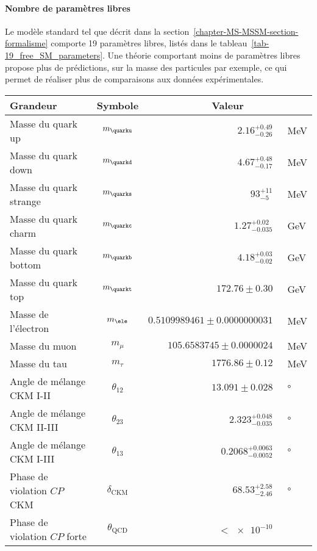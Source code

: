 \paragraph{Nombre de paramètres libres}
Le modèle standard tel que décrit dans la section~\ref{chapter-MS-MSSM-section-formalisme} comporte 19 paramètres libres, listés dans le tableau~\ref{tab-19_free_SM_parameters}.
Une théorie comportant moins de paramètres libres propose plus de prédictions, sur la masse des particules par exemple, ce qui permet de réaliser plus de comparaisons aux données expérimentales.
\begin{table}[h]
\centering
\begin{tabular}{lcrl}
\toprule
Grandeur & Symbole & \multicolumn{2}{c}{Valeur} \\
\midrule
Masse du quark up & $m_{\quarku}$ & $\num{2.16}^{+\num{0.49}}_{-\num{0.26}}$ & \SI{}{\MeV} \\
Masse du quark down & $m_{\quarkd}$ & $\num{4.67}^{+\num{0.48}}_{-\num{0.17}}$ & \SI{}{\MeV} \\
Masse du quark strange & $m_{\quarks}$ & $\num{93}^{+\num{11}}_{-\num{5}}$ & \SI{}{\MeV} \\
Masse du quark charm & $m_{\quarkc}$ & $\num{1.27}^{+\num{0.02}}_{-\num{0.035}}$ & \SI{}{\GeV} \\
Masse du quark bottom & $m_{\quarkb}$ & $\num{4.18}^{+\num{0.03}}_{-\num{0.02}}$ & \SI{}{\GeV} \\
Masse du quark top & $m_{\quarkt}$ & $\num{172.76}\pm\num{0.30}$ & \SI{}{\GeV} \\
Masse de l'électron & $m_{\ele}$ & $\num{0.5109989461}\pm\num{0.0000000031}$ & \SI{}{\MeV} \\
Masse du muon & $m_{\mu}$ & $\num{105.6583745}\pm\num{0.0000024}$ & \SI{}{\MeV} \\
Masse du tau & $m_{\tau}$ & $\num{1776.86}\pm\num{0.12}$ & \SI{}{\MeV} \\
Angle de mélange CKM I-II & $\theta_{12}$ & $\num{13.091}\pm\num{0.028}$ & \SI{}{\degree} \\
Angle de mélange CKM II-III & $\theta_{23}$ & $\num{2.323}^{+\num{0.048}}_{-\num{0.035}}$ & \SI{}{\degree} \\
Angle de mélange CKM I-III & $\theta_{13}$ & $\num{0.2068}^{+\num{0.0063}}_{-\num{0.0052}}$ & \SI{}{\degree} \\
Phase de violation $CP$ CKM & $\delta_{\text{CKM}}$ & $\num{68.53}^{+\num{2.58}}_{-\num{2.46}}$ & \SI{}{\degree} \\
Phase de violation $CP$ forte & $\theta_{\text{QCD}}$ & $<\num{e-10}$ & \\

\end{tabular}
\end{table}
